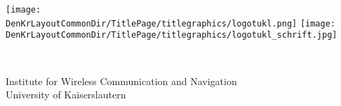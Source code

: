 %
%
%
\begin{minipage}{\textwidth}%
\begin{flushleft}%
\texttt{[image: \\DenKrLayoutCommonDir/TitlePage/titlegraphics/logotukl.png]}%
\hspace*{1em}%
\texttt{[image: \\DenKrLayoutCommonDir/TitlePage/titlegraphics/logotukl\_schrift.jpg]}%
\textsc{\Large }%
\end{flushleft}%
\end{minipage}%
\hfill%
\begin{minipage}{0.5\textwidth}%
\begin{flushright}%
\end{flushright}%
\end{minipage}%
\\%
%
\vspace*{0.05\textheight}%
%

%
\vfill\vfill%
{\large\sffamily Institute for Wireless Communication and Navigation}\\%
{\large\sffamily University of Kaiserslautern}%
%

%
%